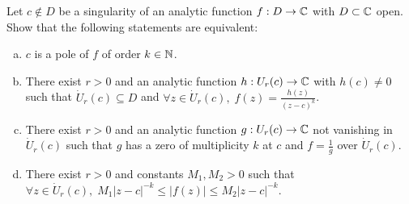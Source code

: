 \documentclass{article}
\begin{document}
Let $c \notin D$ be a singularity of an analytic function $f : D \to \mathbb{C}$ with
$D \subset \mathbb{C}$ open. Show that the following statements are equivalent:
\begin{enumerate}[(a)]
  \item $c$ is a pole of $f$ of order $k \in \mathbb{N}$.
  \item There exist $r > 0$ and an analytic function $h : U_r(c) \to \mathbb{C}$ with
    $h(c) \ne 0$ such that $\dot{U}_r(c) \subseteq D$ and
    $\forall z \in \dot{U}_r(c), \; f(z) = \frac{h(z)}{(z-c)^k}$.
  \item There exist $r > 0$ and an analytic function $g : U_r(c) \to \mathbb{C}$ not
    vanishing in $\dot{U}_r(c)$ such that $g$ has a zero of multiplicity $k$
    at $c$ and $f = \frac{1}{g}$ over $\dot{U}_r(c)$.
  \item There exist $r > 0$ and constants $M_1, M_2 > 0$ such that
    $\forall z \in \dot{U}_r(c), \; M_1 |z-c|^{-k} \le |f(z)| \le M_2 |z-c|^{-k}$.
\end{enumerate}
\end{document}
